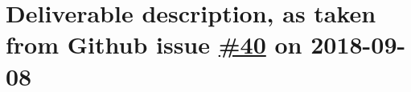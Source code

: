 \section*{\texorpdfstring{Deliverable description, as taken from Github
issue
\href{https://github.com/OpenDreamKit/OpenDreamKit/issues/40}{\#40} on
2018-09-08}{Deliverable description, as taken from Github issue \#40 on 2018-09-08}}\label{deliverable-description-as-taken-from-github-issue-36-on-2018-09-08}

